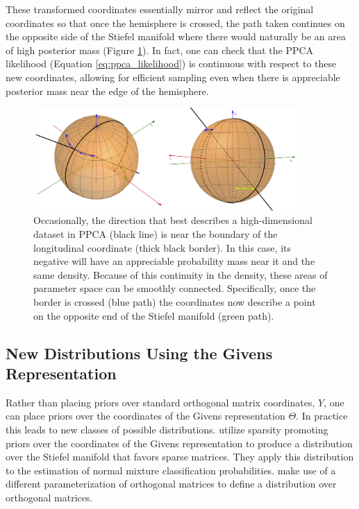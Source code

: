 \documentclass[ba]{imsart}
\numberwithin{equation}{section}
\theoremstyle{plain}
\begin{document}
\noindent These transformed coordinates essentially mirror and reflect the original coordinates so that once the hemisphere is crossed, the path taken continues on the opposite side of the Stiefel manifold where there would naturally be an area of high posterior mass (Figure \ref{fig:givens_mirroring}). In fact, one can check that the PPCA likelihood (Equation \ref{eq:ppca_likelihood}) is continuous with respect to these new coordinates, allowing for efficient sampling even when there is appreciable posterior mass near the edge of the hemisphere.

\begin{figure}[h]
\centering
\vspace{.1in}
\includegraphics[width=0.9\textwidth]{figures/givens_mirroring.png}
\vspace{.05in}
\caption{Occasionally, the direction that best describes a high-dimensional dataset in PPCA (black line) is near the boundary of the longitudinal coordinate (thick black border). In this case, its negative will have an appreciable probability mass near it and the same density. Because of this continuity in the density, these areas of parameter space can be smoothly connected. Specifically, once the border is crossed (blue path) the coordinates now describe a point on the opposite end of the Stiefel manifold (green path).}
\label{fig:givens_mirroring}
\end{figure}

\subsection{New Distributions Using the Givens Representation}
Rather than placing priors over standard orthogonal matrix coordinates, $Y$, one can place priors over the coordinates of the Givens representation $\Theta$. In practice this leads to new classes of possible distributions. \noindent \cite{cron2016models} utilize sparsity promoting priors over the coordinates of the Givens representation to produce a distribution over the Stiefel manifold that favors sparse matrices. They apply this distribution to the estimation of normal mixture classification probabilities. \cite{leon2006statistical} make use of a different parameterization of orthogonal matrices to define a distribution over orthogonal matrices.
\end{document}
